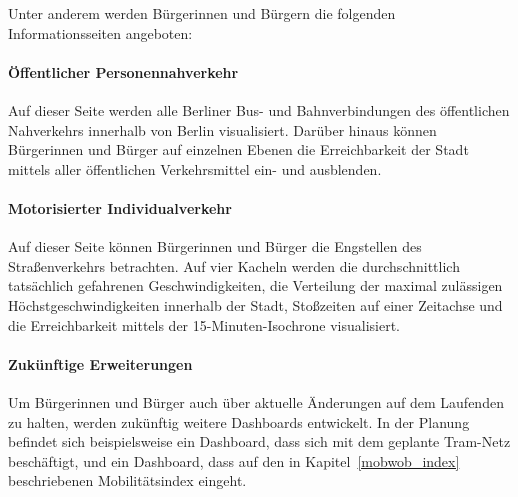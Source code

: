 Unter anderem werden Bürgerinnen und Bürgern die folgenden Informationsseiten angeboten:

\paragraph{Öffentlicher Personennahverkehr}

Auf dieser Seite werden alle Berliner Bus- und Bahnverbindungen des öffentlichen Nahverkehrs innerhalb von Berlin visualisiert. Darüber hinaus können Bürgerinnen und Bürger auf einzelnen Ebenen die Erreichbarkeit der Stadt mittels aller öffentlichen Verkehrsmittel ein- und ausblenden.



\paragraph{Motorisierter Individualverkehr}

Auf dieser Seite können Bürgerinnen und Bürger die Engstellen des Straßenverkehrs betrachten. Auf vier Kacheln werden die durchschnittlich tatsächlich gefahrenen Geschwindigkeiten, die Verteilung der maximal zulässigen Höchstgeschwindigkeiten innerhalb der Stadt, Stoßzeiten auf einer Zeitachse und die Erreichbarkeit mittels der 15-Minuten-Isochrone visualisiert.



\paragraph{Zukünftige Erweiterungen}

Um Bürgerinnen und Bürger auch über aktuelle Änderungen auf dem Laufenden zu halten, werden zukünftig weitere Dashboards entwickelt. In der Planung befindet sich beispielsweise ein Dashboard, dass sich mit dem geplante Tram-Netz beschäftigt, und ein Dashboard, dass auf den in Kapitel~\ref{mobwob_index} beschriebenen Mobilitätsindex eingeht.
